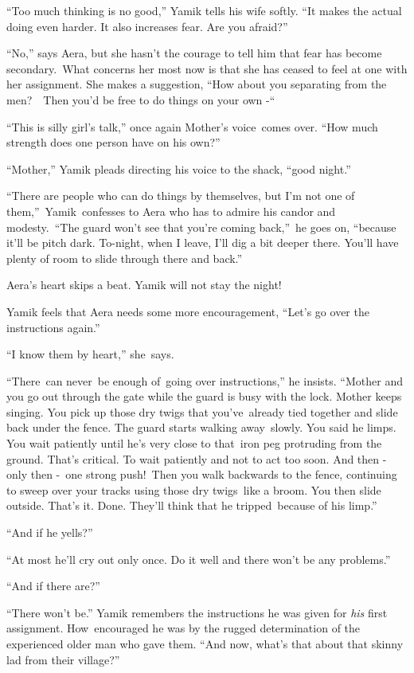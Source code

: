 \documentclass[twoside,11pt]{book}
\begin{document}
{}``Too much thinking is no good,'' Yamik tells his wife softly. ``It makes the actual doing
even harder. It also increases fear. Are you afraid?'' 

{}``No,'' says Aera, but she hasn't the courage to tell him that fear has become secondary.\ What concerns her most now
is that she has ceased to feel at one with her assignment. She makes a suggestion, ``How about you separating from the
men?\ \ Then you'd be free to do things on your own -``\ 

{}``This is silly girl's talk,'' once again Mother's voice\ comes over. ``How much strength
does one person have on his own?'' 

{}``Mother,'' Yamik pleads directing his voice to the shack, ``good night.'' 

{}``There are people who can do things by themselves, but I'm not one of
them,{}''\ Yamik{\ }confesses to Aera who has to admire his candor and
modesty.\ {}``The guard won't see that you're coming back,{}''\ he goes on, ``because it'll be pitch dark. To-night,
when I leave, I'll dig a bit deeper there. You'll have plenty of room to slide through there and back.'' 

Aera's heart skips a beat. Yamik will not stay the night! 

Yamik feels that Aera needs some more encouragement, ``Let's go over the instructions again.'' 

{}``I know them by heart,'' she\ says. 

{}``There~can never~be enough of~going over instructions,'' he insists. ``Mother and you go
out through the gate while the guard is busy with the lock. Mother keeps singing. You pick up those dry twigs that
you've~already tied together and slide back under the fence. The guard starts walking away\ slowly. You said he limps.
You wait patiently until he's very close to that~iron peg protruding from the ground. That's critical. To wait
patiently and not to act too soon. And then -  only then -\ one strong push!\ Then you walk backwards to the fence,
continuing to sweep over your tracks using those dry twigs{\ }like a broom. You
then slide outside. That's it. Done. They'll think that he tripped{\ }because
of his limp.'' 

{}``And if he yells?'' 

{}``At most he'll cry out only once. Do it well and there won't be any problems.'' 

{}``And if there are?'' 

``There won't be.'' Yamik remembers the instructions he was given for \textit{his} first assignment.
How\ encouraged he was by the rugged determination of the experienced older man who gave them. ``And now, what's that
about that skinny lad from their village?'' 
\end{document}
